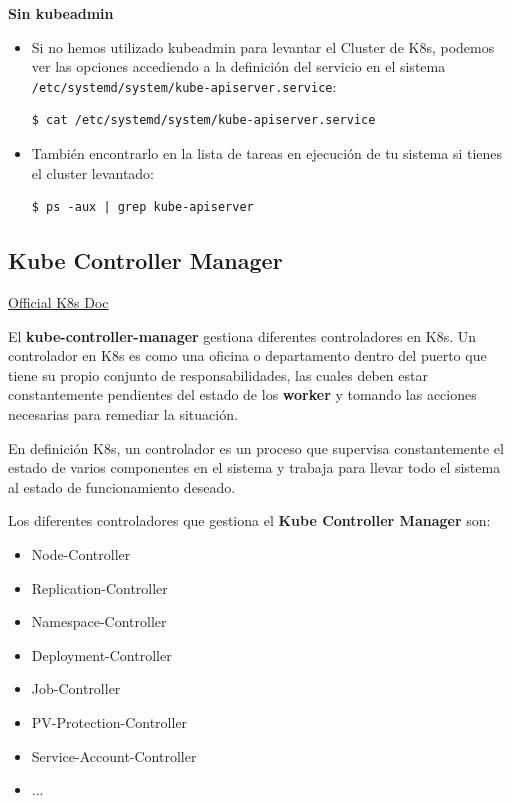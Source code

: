 \documentclass{article}
\newenvironment{codetemplate}[1][]{%
  \mybasecolorbox[#1]
  \itshape
}{%
  \endmybasecolorbox
}
\begin{document}
\textbf{Sin kubeadmin}
\begin{itemize}
    \item Si no hemos utilizado kubeadmin para levantar el Cluster de K8s, podemos ver las opciones accediendo a la definición del servicio en el sistema \verb|/etc/systemd/system/kube-apiserver.service|:
\begin{codetemplate}{}
\begin{verbatim}
$ cat /etc/systemd/system/kube-apiserver.service
\end{verbatim}
\end{codetemplate}

    \item También encontrarlo en la lista de tareas en ejecución de tu sistema si tienes el cluster levantado:
\begin{codetemplate}{}
\begin{verbatim}
$ ps -aux | grep kube-apiserver
\end{verbatim}
\end{codetemplate}
\end{itemize}

\subsection{Kube Controller Manager}

\href{https://kubernetes.io/docs/reference/command-line-tools-reference/kube-controller-manager/}{Official K8s Doc}

El \textbf{kube-controller-manager} gestiona diferentes controladores en K8s. Un controlador en K8s es como una oficina o departamento dentro del puerto que tiene su propio conjunto de responsabilidades, las cuales deben estar constantemente pendientes del estado de los \textbf{worker} y tomando las acciones necesarias para remediar la situación.

En definición K8s, un controlador es un proceso que supervisa constantemente el estado de varios componentes en el sistema y trabaja para llevar todo el sistema al estado de funcionamiento deseado.

Los diferentes controladores que gestiona el \textbf{Kube Controller Manager} son:

\begin{itemize}
    \item Node-Controller
    \item Replication-Controller
    \item Namespace-Controller
    \item Deployment-Controller
    \item Job-Controller
    \item PV-Protection-Controller
    \item Service-Account-Controller
    \item ...
\end{itemize}
\end{document}
